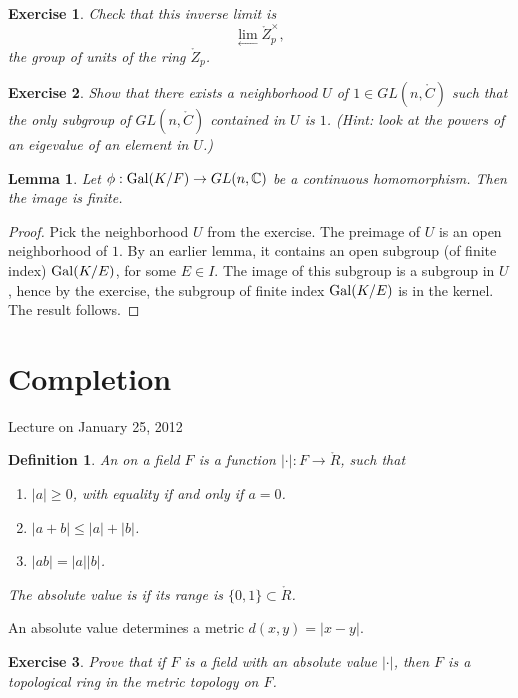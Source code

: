 \documentclass{amsart}
\newtheorem{definition}[equation]{Definition}
\newtheorem{lemma}[equation]{Lemma}
\newtheorem{exercise}{Exercise}
\def\abs#1{{|#1|}}
\def\CC{\ring{C}}
\def\RR{\ring{R}}
\def\oG{\op{Gal}}
\begin{document}
\begin{exercise}
Check that this inverse limit is
\[
\lim_{\leftarrow} \ring{Z}_p^\times,
\]
the group of units of the ring $\ring{Z}_p$.
\end{exercise}

\begin{exercise}  Show that there exists a neighborhood $U$ of $1\in GL(n,\CC)$
such that the only subgroup of $GL(n,\CC)$ contained in $U$ is $1$.
(Hint: look at the powers of an eigevalue of an element in $U$.)
\end{exercise}

\begin{lemma} Let $\phi:\oG(K/F)\to GL(n,\CC)$ be a continuous homomorphism.
Then the image is finite.
\end{lemma}

\begin{proof}  Pick the neighborhood $U$ from the exercise.  The preimage of $U$
is an open neighborhood of $1$.  By an earlier lemma, it contains an open subgroup
(of finite index)
$\oG(K/E)$, for some $E\in I$.  The image of this subgroup is a subgroup
in $U$, hence by the exercise, the subgroup of finite index
$\oG(K/E)$ is in the kernel.  The result follows.
\end{proof}





\newpage
\section{Completion}

Lecture on January 25, 2012

\begin{definition} An  on a field $F$ is a function
$\abs{\cdot}:F\to \RR$, such that
\begin{enumerate}
\item $\abs{a}\ge 0$, with equality if and only if $a=0$.
\item $\abs{a + b}\le \abs{a} + \abs{b}$.
\item $\abs{a b} = \abs{a}\abs{b}$.
\end{enumerate}
The absolute value is  if its range is $\{0,1\}\subset\RR$.
\end{definition}

An absolute value determines a metric $d(x,y) = \abs{x-y}$.

\begin{exercise} Prove that if $F$ is a field with an absolute value
  $\abs{\cdot}$, then $F$ is a topological ring in the metric topology
  on $F$.
\end{exercise}
\end{document}
